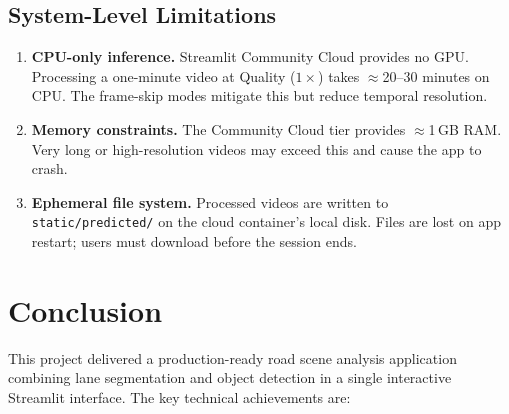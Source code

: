 \documentclass[12pt, a4paper]{article}
\begin{document}
\subsection{System-Level Limitations}

\begin{enumerate}
  \item \textbf{CPU-only inference.}
        Streamlit Community Cloud provides no GPU. Processing a one-minute
        video at Quality ($1\times$) takes $\approx$20--30 minutes on CPU.
        The frame-skip modes mitigate this but reduce temporal resolution.

  \item \textbf{Memory constraints.}
        The Community Cloud tier provides $\approx$1\,GB RAM. Very long
        or high-resolution videos may exceed this and cause the app to crash.

  \item \textbf{Ephemeral file system.}
        Processed videos are written to \texttt{static/predicted/} on the
        cloud container's local disk. Files are lost on app restart;
        users must download before the session ends.
\end{enumerate}

\section{Conclusion}

This project delivered a production-ready road scene analysis application
combining lane segmentation and object detection in a single interactive
Streamlit interface. The key technical achievements are:
\end{document}
